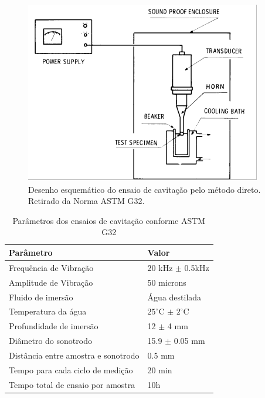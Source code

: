 \begin{figure}
	\centering
	\includegraphics[width=1\columnwidth]{method/figs/adequacao/adequacao5.png}
    \caption{Desenho esquemático do ensaio de cavitação pelo método direto.
    Retirado da Norma ASTM G32.}
    \label{fig:adequacao5}
\end{figure}

\begin{table}[]
\centering
\caption{Parâmetros dos ensaios de cavitação conforme ASTM G32}
\label{tab:param_hvof}
\begin{tabular}{ll}
\hline
Parâmetro                                                 & Valor                                             \\ \hline
\multicolumn{1}{|l|}{Frequência de Vibração}              & \multicolumn{1}{l|}{20 kHz $\pm$ 0.5kHz}          \\ \hline
\multicolumn{1}{|l|}{Amplitude de Vibração}               & \multicolumn{1}{l|}{50 microns}                   \\ \hline
\multicolumn{1}{|l|}{Fluido de imersão}                   & \multicolumn{1}{l|}{Água destilada}               \\ \hline
\multicolumn{1}{|l|}{Temperatura da água}                 & \multicolumn{1}{l|}{$25^\circ$C $\pm$ $2^\circ$C} \\ \hline
\multicolumn{1}{|l|}{Profundidade de imersão}             & \multicolumn{1}{l|}{12 $\pm$ 4 mm}                \\ \hline
\multicolumn{1}{|l|}{Diâmetro do sonotrodo}               & \multicolumn{1}{l|}{15.9 $\pm$ 0.05 mm}           \\ \hline
\multicolumn{1}{|l|}{Distância entre amostra e sonotrodo} & \multicolumn{1}{l|}{0.5 mm}                       \\ \hline
\multicolumn{1}{|l|}{Tempo para cada ciclo de medição}    & \multicolumn{1}{l|}{20 min}                       \\ \hline
\multicolumn{1}{|l|}{Tempo total de ensaio por amostra}   & \multicolumn{1}{l|}{10h}                          \\ \hline
\end{tabular}
\end{table}

